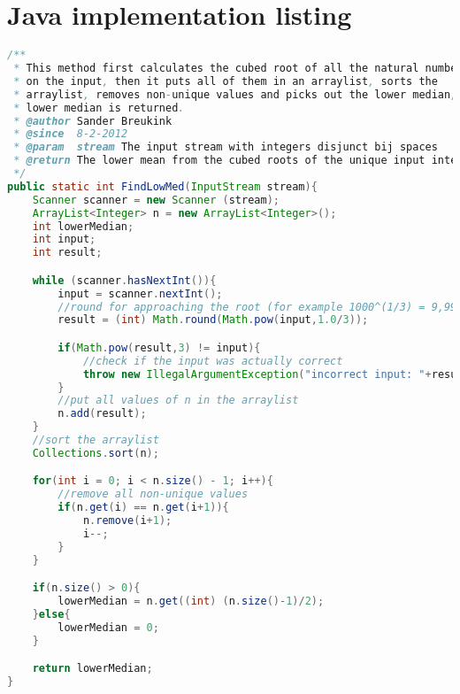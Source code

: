\documentclass[12pt]{article}
\begin{document}
\appendix

\section{Java implementation listing}
\begin{lstlisting}[language=java]
/**
 * This method first calculates the cubed root of all the natural numbers
 * on the input, then it puts all of them in an arraylist, sorts the
 * arraylist, removes non-unique values and picks out the lower median, this
 * lower median is returned.
 * @author Sander Breukink
 * @since  8-2-2012
 * @param  stream The input stream with integers disjunct bij spaces
 * @return The lower mean from the cubed roots of the unique input integers
 */
public static int FindLowMed(InputStream stream){
    Scanner scanner = new Scanner (stream);
    ArrayList<Integer> n = new ArrayList<Integer>();
    int lowerMedian;
    int input;
    int result;

    while (scanner.hasNextInt()){
        input = scanner.nextInt();
        //round for approaching the root (for example 1000^(1/3) = 9,99999999999 -> 10)
        result = (int) Math.round(Math.pow(input,1.0/3));

        if(Math.pow(result,3) != input){
            //check if the input was actually correct
            throw new IllegalArgumentException("incorrect input: "+result+"^3 != " + input);
        }
        //put all values of n in the arraylist
        n.add(result);
    }
    //sort the arraylist
    Collections.sort(n);

    for(int i = 0; i < n.size() - 1; i++){
        //remove all non-unique values
        if(n.get(i) == n.get(i+1)){
            n.remove(i+1);
            i--;
        }
    }

    if(n.size() > 0){
        lowerMedian = n.get((int) (n.size()-1)/2);
    }else{
        lowerMedian = 0;
    }

    return lowerMedian;
}
\end{lstlisting}
\end{document}

